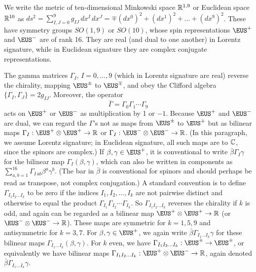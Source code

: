 We write the metric of ten-dimensional Minkowski space
$\Bbb{R}^{1,9}$ or Euclidean space $\Bbb{R}^{10}$ as
$ds^2=\sum_{I,J=0}^9g_{IJ}\,dx^I\,dx^J=\mp (dx^0)^2+(dx^1)^2+\dots
+(dx^9)^2$. These have symmetry groups $SO(1,9)$ or $SO(10)$,
whose spin representations ${\EUS}^+$ and ${\EUS}^-$ are of rank
16. They are real (and dual to one another) in Lorentz signature,
while in Euclidean signature they are complex conjugate
representations.

The gamma matrices $\Gamma_I,\,I=0,\dots,9$ (which in Lorentz
signature are real) reverse the chirality, mapping ${\EUS}^\pm$ to
${\EUS}^\mp$, and obey the Clifford algebra
$\{\Gamma_I,\Gamma_J\}=2g_{IJ}$. Moreover, the operator
\setcounter{equation}{0}
\begin{equation}\label{eq:thop}
\bar\Gamma=\Gamma_0\Gamma_1\cdots\Gamma_9
\end{equation}
 acts on
${\EUS}^+$ or ${\EUS}^-$ as multiplication by 1 or $-1$. Because
${\EUS}^+$ and ${\EUS}^-$ are dual, we can regard the $\Gamma$'s
not as maps from ${\EUS}^\pm$ to ${\EUS}^{\mp}$ but as bilinear
maps $\Gamma_I:{\EUS}^+\otimes {\EUS}^+\to \Bbb{R}$ or
$\Gamma_I:{\EUS}^-\otimes{\EUS}^-\to \Bbb{R}$. (In this paragraph,
we assume Lorentz signature; in Euclidean signature, all such maps
are to $\Bbb{C}$, since the spinors are complex.) If
$\beta,\gamma\in {\EUS}^+$, it is conventional to write $\bar\beta
\Gamma_I\gamma$ for the bilinear map $\Gamma_I(\beta,\gamma)$,
which can also be written in components as
$\sum_{a,b=1}^{16}\Gamma_{I\,ab}\beta^a\gamma^b$. (The bar in
$\bar \beta$ is conventional for spinors and should perhaps be
read as transpose, not complex conjugation.) A standard convention
is to define $\Gamma_{I_1I_2\dots I_k}$ to be zero if the indices
$I_1,I_2,\dots,I_k$ are not pairwise distinct and otherwise to
equal the product $\Gamma_{I_1}\Gamma_{I_2}\cdots \Gamma_{I_k}$.
So $\Gamma_{I_1I_2\dots I_k}$ reverses the chirality if $k$ is
odd, and again can be regarded as a bilinear map ${\EUS}^+\otimes
{\EUS}^+\to \Bbb{R}$ (or ${\EUS}^-\otimes {\EUS}^-\to \Bbb{R}$).
These maps are symmetric for $k=1,5,9$ and antisymmetric for
$k=3,7$.  For $\beta,\gamma\in {\EUS}^+$, we again write
$\bar\beta\Gamma_{I_1\dots I_k}\gamma$ for these bilinear maps
$\Gamma_{I_1\dots I_k}(\beta,\gamma)$. For $k$ even, we have
$\Gamma_{I_1I_2\dots I_k}:{\EUS}^\pm\to{\EUS}^\pm$, or
equivalently we have  bilinear maps $\Gamma_{I_1I_2\dots
I_k}:{\EUS}^+\otimes {\EUS}^-\to \Bbb{R}$, again denoted
$\bar\beta\Gamma_{I_1\dots I_k}\gamma$.


